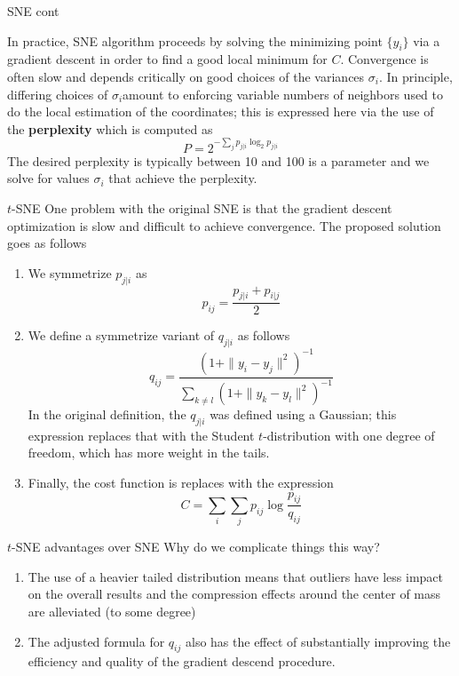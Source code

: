 \documentclass{beamer}
\begin{document}
\begin{frame}{SNE cont}
	
	In practice, SNE algorithm proceeds by solving the minimizing point $\{y_i\}$ via a gradient descent in order to find a good local minimum for $C$.  Convergence is often slow and depends critically on good choices of the variances $\sigma_i$. In principle, differing choices of $\sigma_i$amount to enforcing variable numbers of neighbors used to do the local estimation of the coordinates; this is expressed here via the use of the \textbf{perplexity} which is computed as
	\begin{equation*}
		P= 2^{- \sum_j p_{j|i}\log_2 p_{j|i}}
	\end{equation*}
	The desired perplexity is typically between 10 and 100 is a parameter and we solve for values $\sigma_i$ that achieve the perplexity.

\end{frame}

\begin{frame}{$t$-SNE}
	One problem with the original SNE is that the gradient descent optimization is slow and difficult to achieve convergence. The proposed solution goes as follows
	\begin{enumerate}
		\item We symmetrize $p_{j|i}$ as 
		\begin{equation*}
			p_{ij}= \frac{p_{j|i}+p_{i|j}}{2}
		\end{equation*}
	\item We define a symmetrize variant of $q_{j|i}$ as follows
	\begin{equation*}
		q_{ij}= \frac{(1+\|y_i-y_j\|^2)^{-1}}{\sum_{k\ne l}(1+\|y_k-y_l\|^2)^{-1}}
	\end{equation*}
	In the original definition, the $q_{j|i}$ was defined using a Gaussian; this expression replaces that with the Student $t$-distribution with one degree of freedom, which has more weight in the tails.
	\item Finally, the cost function is replaces with the expression
	\begin{equation*}
		C= \sum_i \sum_j p_{ij} \log \frac{p_{ij}}{q_{ij}}
	\end{equation*}
	\end{enumerate}
\end{frame}

\begin{frame}{$t$-SNE advantages over SNE}
	Why do we complicate things this way?
	\begin{enumerate}
		\item The use of a heavier tailed distribution means that outliers have less impact on the overall results and the compression effects around the center of mass are alleviated (to some degree)
		\item The adjusted formula for $q_{ij}$ also has the effect of substantially improving the efficiency and quality of the gradient descend procedure.
	\end{enumerate}
\end{frame}
\end{document}
